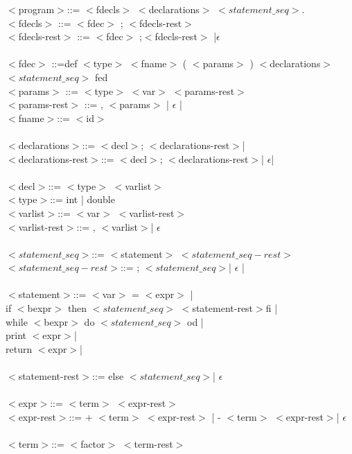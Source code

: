 \documentclass[fleqn]{article}
\begin{document}
$<$program$>$::= $<$fdecls$>$ $<$declarations$>$ $<statement\_ seq>$. \\ 
$<$fdecls$>$ ::= $<$fdec$>$ ; $<$fdecls-rest$>$ \\
$<$fdecls-rest$>$ ::= $<$fdec$>$ ;$<$fdecls-rest$>$ |$\epsilon$\\
\\
$<$fdec$>$ ::=def $<$type$>$ $<$fname$>$ ( $<$params$>$ ) $<$declarations$>$ $<statement\_ seq>$ fed\\
$<$params$>$ ::= $<$type$>$ $<$var$>$ $<$params-rest$>$ \\
$<$params-rest$>$ ::=  ,  $<$params$>$ | $\epsilon$ | \\
$<$fname$>$::= $<$id$>$\\
\\
$<$declarations$>$::= $<$decl$>$; $<$declarations-rest$>$|\\
$<$declarations-rest$>$::= $<$decl$>$; $<$declarations-rest$>$| $\epsilon$|\\
\\
$<$decl$>$::= $<$type$>$ $<$varlist$>$ \\ 
$<$type$>$::= int | double \\
$<$varlist$>$::= $<$var$>$ $<$varlist-rest$>$\\
$<$varlist-rest$>$::= , $<$varlist$>$| $\epsilon$ \\
\\
$<statement\_ seq>$::= $<$statement$>$ $<statement\_ seq-rest>$ \\
$<statement\_ seq-rest>$::=  ; $<statement\_ seq>$| $\epsilon$ |\\
\\
$<$statement$>$::= $<$var$>$ = $<$expr$>$ |\\ 
if $<$bexpr$>$ then $<statement\_ seq>$ $<$statement-rest$>$fi |\\ 
while $<$bexpr$>$ do $<statement\_ seq>$ od |\\ print $<$expr$>$|\\ return $<$expr$>$|  \\
\\
$<$statement-rest$>$::=  else $<statement\_ seq>$| $\epsilon$\\
\\
$<$expr$>$::= $<$term$>$ $<$expr-rest$>$\\
$<$expr-rest$>$::=  + $<$term$>$ $<$expr-rest$>$ |  - $<$term$>$ $<$expr-rest$>$| $\epsilon$\\
\\
$<$term$>$::=  $<$factor$>$ $<$term-rest$>$\\
\end{document}
